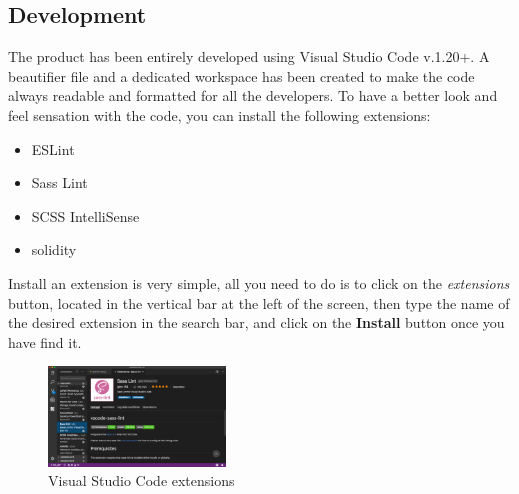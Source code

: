 \subsection{Development}
The product has been entirely developed using Visual Studio Code v.1.20+. A beautifier file and a dedicated workspace has been created to make the code always readable and formatted for all the developers.
To have a better look and feel sensation with the code, you can install the following extensions:
\begin{itemize}
	\item ESLint
	\item Sass Lint
	\item SCSS IntelliSense
	\item solidity
\end{itemize}
Install an extension is very simple, all you need to do is to click on the \emph{extensions} button, located in the vertical bar at the left of the screen, then type the name of the desired extension in the search bar, and click on the \textbf{Install} button once you have find it.
\begin{figure}[H]
	\centering
	\includegraphics[width=0.42\textwidth]{img/extensions.png}
	\caption{Visual Studio Code extensions}
	\label{fig:extensions}
\end{figure}
